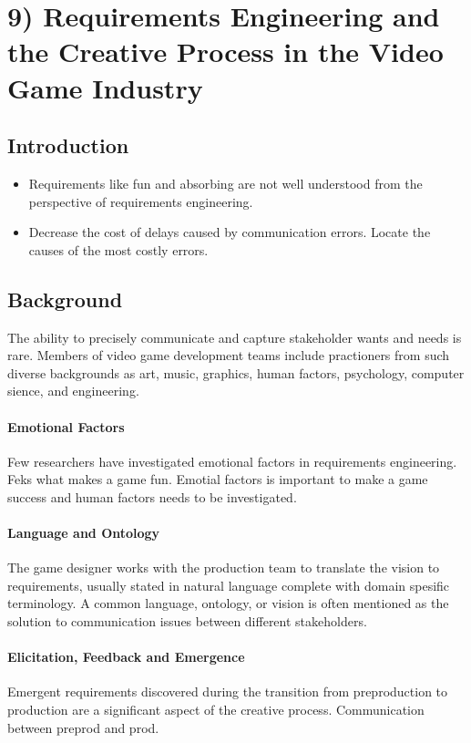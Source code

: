 \chapter*{9) Requirements Engineering and the Creative Process in the Video Game Industry}
  
  \section*{Introduction}

    \begin{itemize}
      \item Requirements like fun and absorbing are not well understood from the perspective of requirements engineering. 
      \item Decrease the cost of delays caused by communication errors. Locate the causes of the most costly errors.
    \end{itemize}

  \section*{Background}

    The ability to precisely communicate and capture stakeholder wants and needs is rare. Members of video game development teams include practioners from such diverse backgrounds as art, music, graphics, human factors, psychology, computer sience, and engineering. 

    \subsubsection*{Emotional Factors}
    Few researchers have investigated emotional factors in requirements engineering. Feks what makes a game fun. Emotial factors is important to make a game success and human factors needs to be investigated.

    \subsubsection*{Language and Ontology}
    The game designer works with the production team to translate the vision to requirements, usually stated in natural language complete with domain spesific terminology. A common language, ontology, or vision is often mentioned as the solution to communication issues between different stakeholders. 

    \subsubsection*{Elicitation, Feedback and Emergence}
    Emergent requirements discovered during the transition from preproduction to production are a significant aspect of the creative process. Communication between preprod and prod.

